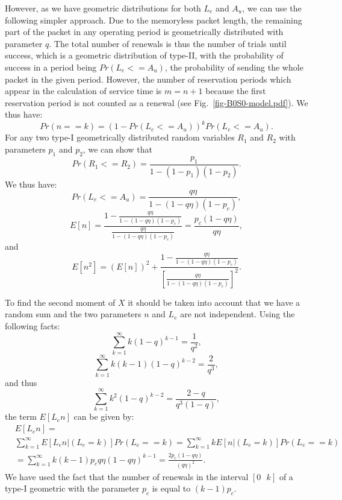 \documentclass[12pt,journal,oneside,onecolumn]{IEEEtran}
\begin{document}
However, as we have  geometric 
distributions for both $L_e$ and $A_u$, we can use the following simpler 
approach.
Due to the memoryless packet length, the remaining part of the packet in any operating period is geometrically 
distributed with parameter $q$.  The total number of renewals is 
thus the number of trials until success, which is a geometric distribution of type-II, with the 
probability of success in a period being $Pr(L_e<=A_u)$, the probability of sending the 
whole packet in the given period. However, the number 
of reservation periods which appear in the calculation of service 
time is $m=n+1$ because the first reservation period is not counted as a 
renewal (see Fig.~\ref{fig-B0S0-model.pdf}). We thus have:
\begin{equation}
Pr(n==k)=(1-Pr(L_e<=A_u))^{k} Pr(L_e<=A_u).
\label{eq:}
\end{equation}
For any two type-I geometrically distributed random 
variables $R_1$ and $R_2$ with parameters $p_1$ and $p_2$, we can show that
\begin{equation}
Pr(R_1<=R_2) = \frac{p_1}{1-(1-p_1)(1-p_2)}.
\label{eq:}
\end{equation}
We thus have:
\begin{equation}
Pr(L_e<=A_u)= \frac{q\eta}{1-(1-q\eta)(1-p_c)},
\label{eq:}
\end{equation}
\begin{equation}
E[n]=\frac{1-\frac{q\eta}{1-(1-q\eta)(1-p_c)}}{\frac{q\eta}{1-(1-q\eta)(1-p_c)}}=\frac{p_c(1-q\eta)}{q\eta},
\label{eq:}
\end{equation}
and
\begin{equation}
E[n^2]=(E[n])^2+\frac{1-\frac{q\eta}{1-(1-q\eta)(1-p_c)}}{[\frac{q\eta}{1-(1-q\eta)(1-p_c)}]^2}.
\label{eq:}
\end{equation}

To find the second moment of $X$ it should be taken into account that we have a 
random sum and the two parameters $n$ and $L_e$ are not independent. Using the 
following facts: 
\begin{equation}
\sum_{k=1}^{\infty} k(1-q)^{k-1} = \frac{1}{q^2},
\label{eq:}
\end{equation}
\begin{equation}
\sum_{k=1}^{\infty} k(k-1)(1-q)^{k-2} = \frac{2}{q^3},
\label{eq:}
\end{equation}
and thus
\begin{equation}
\sum_{k=1}^{\infty} k^2(1-q)^{k-2} = \frac{2-q}{q^3(1-q)},
\label{eq:}
\end{equation}
the term $E[L_en]$ can be given by:
\footnotesize
\begin{align}
&E[L_en]= \nonumber \\
&\sum_{k=1}^{\infty}{E[L_en|(L_e=k)] Pr(L_e==k)}=\sum_{k=1}^{\infty}{k E[n|(L_e=k)] Pr(L_e==k)} \nonumber \\
&=\sum_{k=1}^{\infty}{k (k-1) p_c q\eta(1-q\eta)^{k-1}} = \frac{2p_c(1-q\eta)}{(q\eta)^2}.
\label{eq:cor-of-T-Ka}
\end{align}
\normalsize
We have used the fact that the number of renewals in the 
interval $[0 \mbox{ } k]$ of a type-I geometric with the parameter $p_c$ is equal to $(k-1)p_c$.
\end{document}
